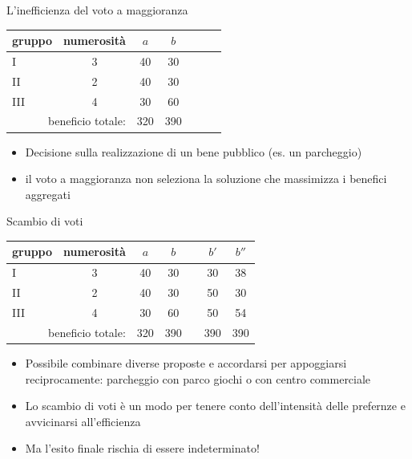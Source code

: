 \documentclass[11pt]{beamer}
\begin{document}
\begin{frame}{L'inefficienza del voto a maggioranza}
\begin{center}
\begin{tabular}{lcccccc}\toprule
    gruppo& numerosità &$a$ &$b$\\
    \midrule
    I      & 3 & 40 & 30\\
    II     & 2 & 40 & 30\\
    III    & 4 & 30 & 60\\\midrule
    \multicolumn{2}{r}{beneficio totale:} & 320 & 390\\
    \bottomrule
\end{tabular}
\end{center}

\begin{itemize}
\item Decisione sulla realizzazione di un bene pubblico (es. un parcheggio)
\item il voto a maggioranza non seleziona la soluzione che massimizza i benefici aggregati
\end{itemize}
\end{frame}

\begin{frame}{Scambio di voti}
\begin{center}
\begin{tabular}{lcccccc}\toprule
    gruppo& numerosità &$a$ &$b$ &&$b'$ &$b''$\\
    \midrule
    I      & 3 & 40 & 30 && 30 & 38\\
    II     & 2 & 40 & 30 && 50 & 30\\
    III    & 4 & 30 & 60 && 50 & 54\\\midrule
    \multicolumn{2}{r}{beneficio totale:} & 320 & 390 &&390 & 390\\
    \bottomrule
\end{tabular}
\end{center}

\begin{itemize}
\item Possibile combinare diverse proposte e accordarsi per appoggiarsi reciprocamente: parcheggio con parco giochi o con centro commerciale
\item Lo scambio di voti è un modo per tenere conto dell'intensità delle prefernze e avvicinarsi all'efficienza
\item Ma l'esito finale rischia di essere indeterminato!
\end{itemize}
\end{frame}
\end{document}
